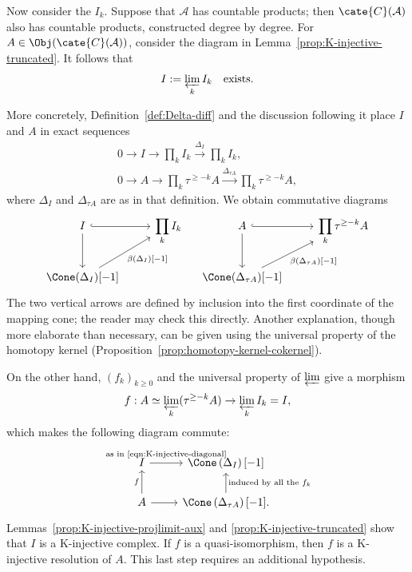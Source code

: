 Now consider the $I_k$. Suppose that $\mathcal{A}$ has countable products;
then $\cate{C}(\mathcal{A})$ also has countable products, constructed degree
by degree. For $A\in\Obj(\cate{C}(\mathcal{A}))$, consider the diagram in
Lemma~\ref{prop:K-injective-truncated}. It follows that
\[
I:=\varprojlim_k I_k \quad \text{exists}.
\]

More concretely, Definition~\ref{def:Delta-diff} and the discussion following
it place $I$ and $A$ in exact sequences
\begin{gather*}
	0 \to I \to \prod_k I_k \xrightarrow{\Delta_I} \prod_k I_k, \\
	0 \to A \to \prod_k \tau^{\geq -k} A
	\xrightarrow{\Delta_{\tau A}} \prod_k \tau^{\geq -k} A,
\end{gather*}
where $\Delta_I$ and $\Delta_{\tau A}$ are as in that definition. We obtain
commutative diagrams
\begin{equation}\label{eqn:K-injective-diagonal}\begin{tikzcd}
	I \arrow[hookrightarrow, r] \arrow[d] & \displaystyle\prod_k I_k \\
	\Cone(\Delta_I)[-1] \arrow[ru, "{\beta(\Delta_I)[-1]}"'] &
\end{tikzcd} \quad \begin{tikzcd}
	A \arrow[hookrightarrow, r] \arrow[d] &
	\displaystyle\prod_k \tau^{\geq -k} A \\
	\Cone(\Delta_{\tau A})[-1]
	\arrow[ru, "{\beta(\Delta_{\tau A})[-1]}"']
\end{tikzcd}\end{equation}
The two vertical arrows are defined by inclusion into the first coordinate of
the mapping cone; the reader may check this directly. Another explanation,
though more elaborate than necessary, can be given using the universal
property of the homotopy kernel
(Proposition~\ref{prop:homotopy-kernel-cokernel}).

On the other hand, $(f_k)_{k\geq0}$ and the universal property of
$\varprojlim$ give a morphism
\[
f:A\simeq\varprojlim_k(\tau^{\geq-k}A)\to\varprojlim_k I_k=I,
\]
which makes the following diagram commute:
\begin{equation}\label{eqn:K-injective-A-I}\begin{tikzcd}
	I \arrow[r, "\text{as in \eqref{eqn:K-injective-diagonal}}"
	inner sep=0.4em] & \Cone\left(\Delta_I\right)[-1] \\
	A \arrow[r] \arrow[u, "f"] &
	\Cone\left( \Delta_{\tau A} \right)[-1]
	\arrow[u, "\text{induced by all the $f_k$}"'].
\end{tikzcd}\end{equation}
Lemmas~\ref{prop:K-injective-projlimit-aux} and
\ref{prop:K-injective-truncated} show that $I$ is a K-injective complex. If
$f$ is a quasi-isomorphism, then $f$ is a K-injective resolution of $A$.
This last step requires an additional hypothesis.

